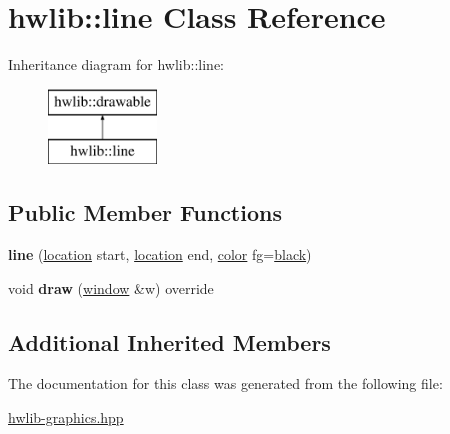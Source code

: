 \hypertarget{classhwlib_1_1line}{}\section{hwlib\+:\+:line Class Reference}
\label{classhwlib_1_1line}
Inheritance diagram for hwlib\+:\+:line\+:\begin{figure}[H]
\begin{center}
\leavevmode
\includegraphics[height=2.000000cm]{classhwlib_1_1line}
\end{center}
\end{figure}
\subsection*{Public Member Functions}
\begin{DoxyCompactItemize}
\item 
{\bfseries line} (\hyperlink{classhwlib_1_1location}{location} start, \hyperlink{classhwlib_1_1location}{location} end, \hyperlink{classhwlib_1_1color}{color} fg=\hyperlink{namespacehwlib_aa9c056fa29bc9af9f55d4b774bb3898a}{black})\hypertarget{classhwlib_1_1line_a2d016ff29a2b0c6db2976651fbd40c8d}{}\label{classhwlib_1_1line_a2d016ff29a2b0c6db2976651fbd40c8d}

\item 
void {\bfseries draw} (\hyperlink{classhwlib_1_1window}{window} \&w) override\hypertarget{classhwlib_1_1line_a0a30c7c7e88377aada5ee1ec422bfc84}{}\label{classhwlib_1_1line_a0a30c7c7e88377aada5ee1ec422bfc84}

\end{DoxyCompactItemize}
\subsection*{Additional Inherited Members}


The documentation for this class was generated from the following file\+:\begin{DoxyCompactItemize}
\item 
\hyperlink{hwlib-graphics_8hpp}{hwlib-\/graphics.\+hpp}\end{DoxyCompactItemize}
